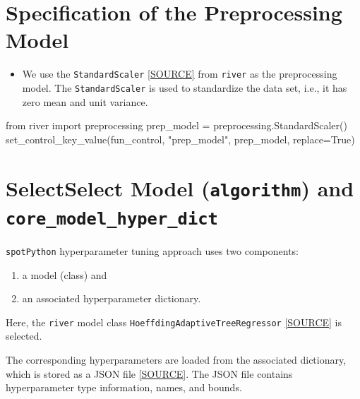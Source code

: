 \documentclass[
  letterpaper,
  DIV=11,
  numbers=noendperiod]{scrreprt}
\newenvironment{Shaded}{\begin{snugshade}}{\end{snugshade}}
\newcommand{\ImportTok}[1]{\textcolor[rgb]{0.00,0.46,0.62}{#1}}
\newcommand{\NormalTok}[1]{\textcolor[rgb]{0.00,0.23,0.31}{#1}}
\newcommand{\OperatorTok}[1]{\textcolor[rgb]{0.37,0.37,0.37}{#1}}
\newcommand{\StringTok}[1]{\textcolor[rgb]{0.13,0.47,0.30}{#1}}
\newcommand{\VariableTok}[1]{\textcolor[rgb]{0.07,0.07,0.07}{#1}}
\providecommand{\tightlist}{%
  \setlength{\itemsep}{0pt}\setlength{\parskip}{0pt}}\usepackage{longtable,booktabs,array}
\begin{document}
\section{Specification of the Preprocessing
Model}\label{specification-of-the-preprocessing-model}

\begin{itemize}
\tightlist
\item
  We use the \texttt{StandardScaler}
  \href{https://riverml.xyz/dev/api/preprocessing/StandardScaler/}{{[}SOURCE{]}}
  from \texttt{river} as the preprocessing model. The
  \texttt{StandardScaler} is used to standardize the data set, i.e., it
  has zero mean and unit variance.
\end{itemize}

\begin{Shaded}
\begin{Highlighting}[]
\ImportTok{from}\NormalTok{ river }\ImportTok{import}\NormalTok{ preprocessing}
\NormalTok{prep\_model }\OperatorTok{=}\NormalTok{ preprocessing.StandardScaler()}
\NormalTok{set\_control\_key\_value(fun\_control, }\StringTok{"prep\_model"}\NormalTok{, prep\_model, replace}\OperatorTok{=}\VariableTok{True}\NormalTok{)}
\end{Highlighting}
\end{Shaded}

\section{\texorpdfstring{SelectSelect Model (\texttt{algorithm}) and
\texttt{core\_model\_hyper\_dict}}{SelectSelect Model (algorithm) and core\_model\_hyper\_dict}}\label{selectselect-model-algorithm-and-core_model_hyper_dict}

\texttt{spotPython} hyperparameter tuning approach uses two components:

\begin{enumerate}
\def\labelenumi{\arabic{enumi}.}
\tightlist
\item
  a model (class) and
\item
  an associated hyperparameter dictionary.
\end{enumerate}

Here, the \texttt{river} model class
\texttt{HoeffdingAdaptiveTreeRegressor}
\href{https://riverml.xyz/dev/api/tree/HoeffdingAdaptiveTreeRegressor/}{{[}SOURCE{]}}
is selected.

The corresponding hyperparameters are loaded from the associated
dictionary, which is stored as a JSON file
\href{https://github.com/sequential-parameter-optimization/spotRiver/blob/main/src/spotRiver/data/river_hyper_dict.json}{{[}SOURCE{]}}.
The JSON file contains hyperparameter type information, names, and
bounds.
\end{document}
